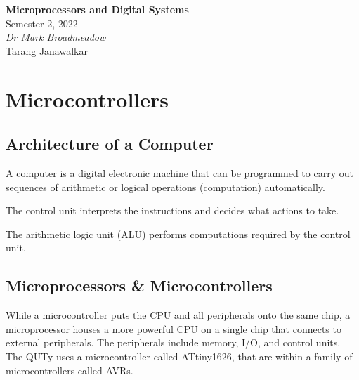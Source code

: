 \documentclass[a4paper]{report}
\date{}
\newcommand{\unitName}{Microprocessors and Digital Systems}
\newcommand{\unitTime}{Semester 2, 2022}
\newcommand{\unitCoordinator}{Dr Mark Broadmeadow}
\newcommand{\documentAuthors}{Tarang Janawalkar}
\begin{document}
%
\begin{titlepage}
    \vspace*{\fill}
    \begin{center}
        \LARGE{\textbf{\unitName}} \\[0.1in]
        \normalsize{\unitTime} \\[0.2in]
        \normalsize\textit{\unitCoordinator} \\[0.2in]
        \documentAuthors
    \end{center}
    \vspace*{\fill}
    \doclicenseThis
    \thispagestyle{empty}
\end{titlepage}
\newpage
%
\tableofcontents
\newpage
%
\chapter{Microcontrollers}
\section{Architecture of a Computer}
\begin{definition}[Computer]
    A computer is a digital electronic machine that can be programmed to carry
    out sequences of arithmetic or logical operations (computation) automatically.
\end{definition}
\begin{definition}
    The control unit interprets the instructions and decides what actions to take.
\end{definition}
\begin{definition}
    The arithmetic logic unit (ALU) performs computations required by the control unit.
\end{definition}
\section{Microprocessors \& Microcontrollers}
While a microcontroller puts the CPU and all peripherals onto the same chip,
a microprocessor houses a more powerful CPU on a single chip that connects to external peripherals.
The peripherals include memory, I/O, and control units.
The QUTy uses a microcontroller called ATtiny1626, that are within a family of microcontrollers called AVRs.
\end{document}
